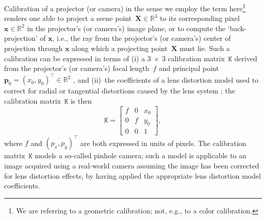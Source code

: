 \documentclass[review]{elsarticle}
\begin{document}
Calibration of a projector (or camera) in the sense we employ the term here\footnote{We are referring to a geometric calibration; not, e.g., to a color calibration.} renders one able to project a scene point~$\mathbf{X} \in \mathbb{R}^3$ to its corresponding pixel~$\mathbf{x} \in \mathbb{R}^2$ in the projector's (or camera's) image plane, or to compute the `back-projection' of $\mathbf{x}$, i.e., the ray from the projector's (or camera's) center of projection through $\mathbf{x}$ along which a projecting point~$\mathbf{X}$ must lie. Such a calibration can be expressed in terms of (i) a $3~\times{}~3$ calibration matrix~$\mathtt{K}$ derived from the projector's (or camera's) focal length~$f$ and principal point~$\mathbf{p}_0 = (x_0, y_0)^\top \in \mathbb{R}^2$ \cite{Hartley2004}, and (ii)~the coefficients of a lens distortion model used to correct for radial or tangential distortions caused by the lens system \cite{duane1971close,weng1992camera}; the calibration matrix~$\mathtt{K}$ is then
\begin{equation}
\mathtt{K} = \begin{bmatrix}
f & 0 & x_0 \\
0 & f & y_0 \\
0 & 0 & 1
\end{bmatrix},
\end{equation}
where $f$ and $(p_x, p_y)^\top$ are both expressed in units of pixels. The calibration matrix~$\mathtt{K}$ models a so-called pinhole camera; such a model is applicable to an image acquired using a real-world camera assuming the image has been corrected for lens distortion effects, by having applied the appropriate lens distortion model coefficients.
\end{document}
